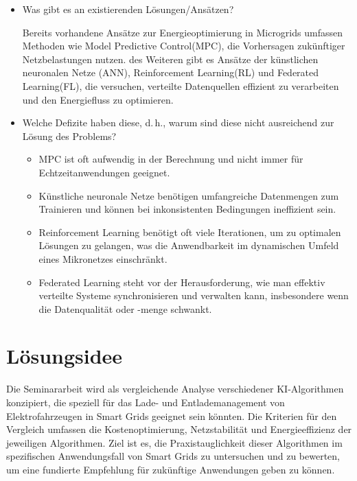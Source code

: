 \documentclass[12pt]{article} %
\begin{document}
\begin{itemize}
\item Was gibt es an existierenden Lösungen/Ansätzen?

Bereits vorhandene Ansätze zur Energieoptimierung in Microgrids umfassen Methoden wie
Model Predictive Control(MPC), die Vorhersagen zukünftiger Netzbelastungen nutzen.
des Weiteren gibt es Ansätze der künstlichen neuronalen Netze (ANN), Reinforcement Learning(RL) und Federated Learning(FL), die versuchen, verteilte Datenquellen effizient zu verarbeiten und den Energiefluss zu optimieren.
\item Welche Defizite haben diese, d.\,h., warum sind diese nicht ausreichend
      zur Lösung des Problems?

     \begin{itemize}
      \item MPC ist oft aufwendig in der Berechnung und nicht immer für Echtzeitanwendungen geeignet.
      \item Künstliche neuronale Netze benötigen umfangreiche Datenmengen zum Trainieren und können bei inkonsistenten Bedingungen ineffizient sein.
      \item Reinforcement Learning benötigt oft viele Iterationen, um zu optimalen Lösungen zu gelangen, was die Anwendbarkeit im dynamischen Umfeld eines Mikronetzes einschränkt.
      \item Federated Learning steht vor der Herausforderung, wie man effektiv verteilte Systeme synchronisieren und verwalten kann, insbesondere wenn die Datenqualität oder -menge schwankt.
      \end{itemize}




      
\end{itemize}


\section{Lösungsidee}

Die Seminararbeit wird als vergleichende Analyse verschiedener KI-Algorithmen konzipiert, die speziell für das Lade- und Entlademanagement von Elektrofahrzeugen in Smart Grids geeignet sein könnten. Die Kriterien für den Vergleich umfassen die Kostenoptimierung, Netzstabilität und Energieeffizienz der jeweiligen Algorithmen. Ziel ist es, die Praxistauglichkeit dieser Algorithmen im spezifischen Anwendungsfall von Smart Grids zu untersuchen und zu bewerten, um eine fundierte Empfehlung für zukünftige Anwendungen geben zu können.
\end{document}
